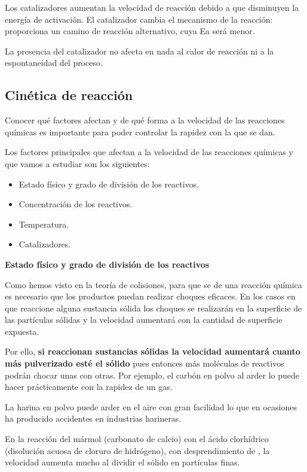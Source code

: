 \documentclass[
  spanish,
]{article}
\providecommand{\tightlist}{%
  \setlength{\itemsep}{0pt}\setlength{\parskip}{0pt}}
\begin{document}
Los catalizadores aumentan la velocidad de reacción debido a que
disminuyen la energía de activación. El catalizador cambia el mecanismo
de la reacción: proporciona un camino de reacción alternativo, cuya Ea
será menor.

La presencia del catalizador no afecta en nada al calor de reacción ni a
la espontaneidad del proceso.

\hypertarget{cinuxe9tica-de-reacciuxf3n}{%
\subsection{Cinética de reacción}\label{cinuxe9tica-de-reacciuxf3n}}

Conocer qué factores afectan y de qué forma a la velocidad de las
reacciones químicas es importante para poder controlar la rapidez con la
que se dan.

Los factores principales que afectan a la velocidad de las reacciones
químicas y que vamos a estudiar son los siguientes:

\begin{itemize}
\tightlist
\item
  Estado físico y grado de división de los reactivos.
\item
  Concentración de los reactivos.
\item
  Temperatura.
\item
  Catalizadores.
\end{itemize}

\textbf{Estado físico y grado de división de los reactivos}

Como hemos visto en la teoría de colisiones, para que se de una reacción
química es necesario que los productos puedan realizar choques eficaces.
En los casos en que reaccione alguna sustancia sólida los choques se
realizarán en la superficie de las partículas sólidas y la velocidad
aumentará con la cantidad de superficie expuesta.

Por ello, \textbf{si reaccionan sustancias sólidas la velocidad
aumentará cuanto más pulverizado esté el sólido} pues entonces más
moléculas de reactivos podrán chocar unas con otras. Por ejemplo, el
carbón en polvo al arder lo puede hacer prácticamente con la rapidez de
un gas.

La harina en polvo puede arder en el aire con gran facilidad lo que en
ocasiones ha producido accidentes en industrias harineras.

En la reacción del mármol (carbonato de calcio) con el ácido clorhídrico
(disolución acuosa de cloruro de hidrógeno), con desprendimiento de
, la velocidad aumenta mucho al dividir el sólido en partículas
finas.
\end{document}
